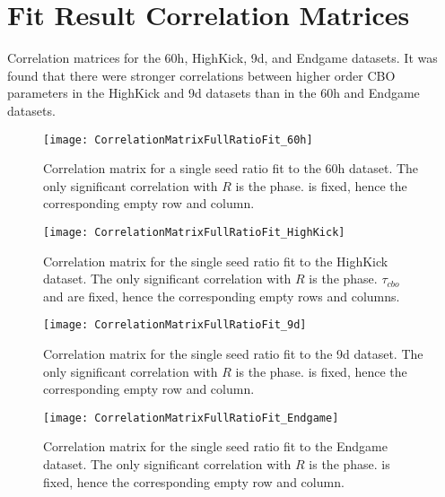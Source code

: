 
\thispagestyle{myheadings}

\graphicspath{{Body/Figures/Wa/Datasets/Endgame/SingleIteration/CaloFits/}{Body/Figures/Wa/Datasets/60h/SingleIteration/SingleFits/}{Body/Figures/Wa/Datasets/HighKick/SingleIteration/SingleFits/}{Body/Figures/Wa/Datasets/9d/SingleIteration/SingleFits/}{Body/Figures/Wa/Datasets/Endgame/SingleIteration/SingleFits/}}


\chapter{Fit Result Correlation Matrices}
\label{app:CorrelationMatrices}

Correlation matrices for the 60h, HighKick, 9d, and Endgame datasets. It was found that there were stronger correlations between higher order CBO parameters in the HighKick and 9d datasets than in the 60h and Endgame datasets.


\begin{figure}
    \centering
    \texttt{[image: CorrelationMatrixFullRatioFit\_60h]}
    \caption[60h ratio fit correlation matrix]{Correlation matrix for a single seed ratio fit to the 60h dataset. The only significant correlation with $R$ is the \gmtwo phase. \K is fixed, hence the corresponding empty row and column.}
    \label{fig:CorrMat_60h}
\end{figure}


\begin{figure}
    \centering
    \texttt{[image: CorrelationMatrixFullRatioFit\_HighKick]}
    \caption[HighKick ratio fit correlation matrix]{Correlation matrix for the single seed ratio fit to the HighKick dataset. The only significant correlation with $R$ is the \gmtwo phase. $\tau_{cbo}$ and \K are fixed, hence the corresponding empty rows and columns.}
    \label{fig:CorrMat_HighKick}
\end{figure}

\begin{figure}
    \centering
    \texttt{[image: CorrelationMatrixFullRatioFit\_9d]}
    \caption[9d ratio fit correlation matrix]{Correlation matrix for the single seed ratio fit to the 9d dataset. The only significant correlation with $R$ is the \gmtwo phase. \K is fixed, hence the corresponding empty row and column.}
    \label{fig:CorrMat_9d}
\end{figure}


\begin{figure}
    \centering
    \texttt{[image: CorrelationMatrixFullRatioFit\_Endgame]}
    \caption[Endgame ratio fit correlation matrix]{Correlation matrix for the single seed ratio fit to the Endgame dataset. The only significant correlation with $R$ is the \gmtwo phase. \K is fixed, hence the corresponding empty row and column.}
    \label{fig:CorrMat_Endgame}
\end{figure}


